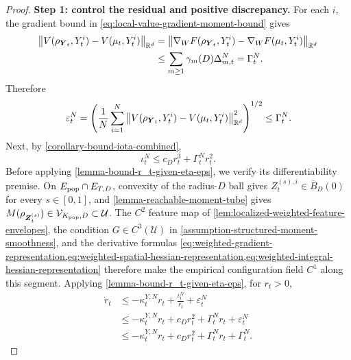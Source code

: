 \begin{proof}
\noindent\textbf{Step 1: control the residual and positive discrepancy.}
For each \(i\), the gradient bound in \cref{eq:local-value-gradient-moment-bound} gives
\begin{equation}
\begin{aligned}
 \norm{V(\rho_{\boldsymbol{Y}_t},Y_t^i)-V(\mu_t,Y_t^i)}_{\mathbb R^d}
 &=\norm{\nabla_WF(\rho_{\boldsymbol{Y}_t},Y_t^i)-\nabla_WF(\mu_t,Y_t^i)}_{\mathbb R^d}\\
 &\le\sum_{m\ge1}\gamma_m(D)\Delta_{m,t}^N=\Gamma_t^N.
\end{aligned}
\end{equation}
Therefore
\begin{equation}
    \varepsilon_t^N
    =
    \left(
        \frac1N\sum_{i=1}^N
        \norm{V(\rho_{\boldsymbol{Y}_t},Y_t^i)-V(\mu_t,Y_t^i)}_{\mathbb R^d}^2
    \right)^{1/2}
    \le
    \Gamma_t^N.
\end{equation}
Next, by \cref{corollary-bound-iota-combined},
\begin{equation}
    \iota_t^N
    \le
    c_Dr_t^3+
    \Gamma_t^Nr_t^2.
\end{equation}
Before applying \cref{lemma-bound-r_t-given-eta-eps}, we verify its
differentiability premise. On $E_{\rm pop}\cap E_{T,D}$, convexity of the
radius-$D$ ball gives $Z_t^{(s),i}\in\overline B_D(0)$ for every
$s\in[0,1]$, and \cref{lemma-reachable-moment-tube} gives
$M(\rho_{\boldsymbol{Z}_t^{(s)}})\in\mathcal V_{K_{\rm pop},D}\subset\mathcal U$.
The $C^2$ feature map of \cref{lem:localized-weighted-feature-envelopes},
the condition $G\in C^3(\mathcal U)$ in
\cref{assumption-structured-moment-smoothness}, and the derivative formulas
\cref{eq:weighted-gradient-representation,eq:weighted-spatial-hessian-representation,eq:weighted-integral-hessian-representation}
therefore make the empirical configuration field $C^1$ along this segment.
Applying \cref{lemma-bound-r_t-given-eta-eps}, for \(r_t>0\),
\begin{align}
    \dot r_t
    &\le
    -\kappa_t^{Y,N}r_t
    +
    \frac{\iota_t^N}{r_t}
    +
    \varepsilon_t^N\\
    &\le
    -\kappa_t^{Y,N}r_t
    +
    c_Dr_t^2
    +
    \Gamma_t^Nr_t
    +
    \varepsilon_t^N\\
    &\le
    -\kappa_t^{Y,N}r_t
    +
    c_Dr_t^2
    +
    \Gamma_t^Nr_t
    +
    \Gamma_t^N.
\end{align}


\end{proof}
